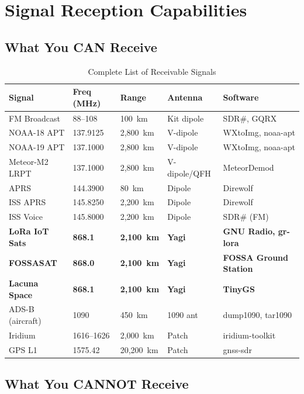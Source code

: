 \documentclass[12pt,a4paper]{article}
\begin{document}
\section{Signal Reception Capabilities}

\subsection{What You CAN Receive}

\begin{longtable}{@{}p{3.5cm}lllp{3.5cm}@{}}
\caption{Complete List of Receivable Signals} \\
\toprule
\textbf{Signal} & \textbf{Freq (MHz)} & \textbf{Range} & \textbf{Antenna} & \textbf{Software} \\
\midrule
\endfirsthead

FM Broadcast & 88--108 & 100~km & Kit dipole & SDR\#, GQRX \\
NOAA-18 APT & 137.9125 & 2,800~km & V-dipole & WXtoImg, noaa-apt \\
NOAA-19 APT & 137.1000 & 2,800~km & V-dipole & WXtoImg, noaa-apt \\
Meteor-M2 LRPT & 137.1000 & 2,800~km & V-dipole/QFH & MeteorDemod \\
APRS & 144.3900 & 80~km & Dipole & Direwolf \\
ISS APRS & 145.8250 & 2,200~km & Dipole & Direwolf \\
ISS Voice & 145.8000 & 2,200~km & Dipole & SDR\# (FM) \\
\textbf{LoRa IoT Sats} & \textbf{868.1} & \textbf{2,100~km} & \textbf{Yagi} & \textbf{GNU Radio, gr-lora} \\
\textbf{FOSSASAT} & \textbf{868.0} & \textbf{2,100~km} & \textbf{Yagi} & \textbf{FOSSA Ground Station} \\
\textbf{Lacuna Space} & \textbf{868.1} & \textbf{2,100~km} & \textbf{Yagi} & \textbf{TinyGS} \\
ADS-B (aircraft) & 1090 & 450~km & 1090 ant & dump1090, tar1090 \\
Iridium & 1616--1626 & 2,000~km & Patch & iridium-toolkit \\
GPS L1 & 1575.42 & 20,200~km & Patch & gnss-sdr \\
\bottomrule
\end{longtable}

\subsection{What You CANNOT Receive}
\end{document}
